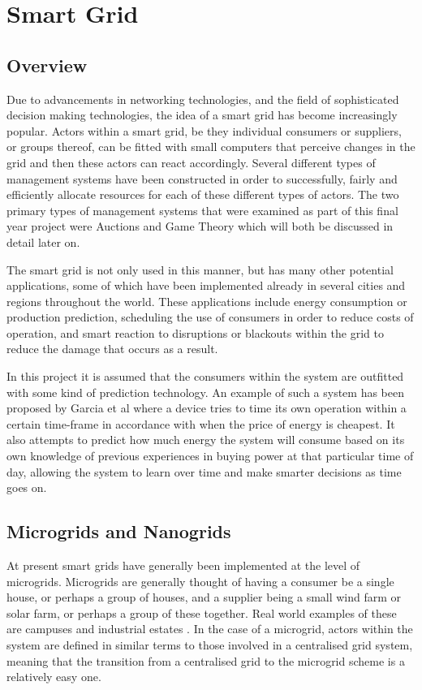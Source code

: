 \documentclass[a4paper, notitlepage]{report}
\begin{document}
\chapter{Smart Grid}
\label{sec:org2b28d20}
\section{Overview}
\label{sec:org00d2d26}
Due to advancements in networking technologies, and the field of sophisticated
decision making technologies, the idea of a smart grid has become increasingly
popular. Actors within a smart grid, be they individual consumers or suppliers,
or groups thereof, can be fitted with small computers that perceive changes in
the grid and then these actors can react accordingly. Several different types of
management systems have been constructed in order to successfully, fairly and
efficiently allocate resources for each of these different types of actors. The
two primary types of management systems that were examined as part of this final
year project were Auctions and Game Theory which will both be discussed in
detail later on. 

The smart grid is not only used in this manner, but has many other potential
applications, some of which have been implemented already in several cities and
regions throughout the world. These applications include energy consumption or
production prediction, scheduling the use of consumers in order to reduce costs
of operation, and smart reaction to disruptions or blackouts within the grid to
reduce the damage that occurs as a result. 

In this project it is assumed that the consumers within the system are outfitted
with some kind of prediction technology. An example of such a system has been
proposed by Garcia et al \cite{mohsenian2010optimal} where a device tries to time
its own operation within a certain time-frame in accordance with when the price
of energy is cheapest. It also attempts to predict how much energy the system
will consume based on its own knowledge of previous experiences in buying power
at that particular time of day, allowing the system to learn over time and make
smarter decisions as time goes on. 
\section{Microgrids and Nanogrids}
\label{sec:org78608e8}
At present smart grids have generally been implemented at the level of
microgrids. Microgrids are generally thought of having a consumer be a single
house, or perhaps a group of houses, and a supplier being a small wind farm or
solar farm, or perhaps a group of these together. Real world examples of these
are campuses and industrial estates \cite{markvart2006microgrids}. In the case of
a microgrid, actors within the system are defined in similar terms to those
involved in a centralised grid system, meaning that the transition from a
centralised grid to the microgrid scheme is a relatively easy one.
\end{document}
